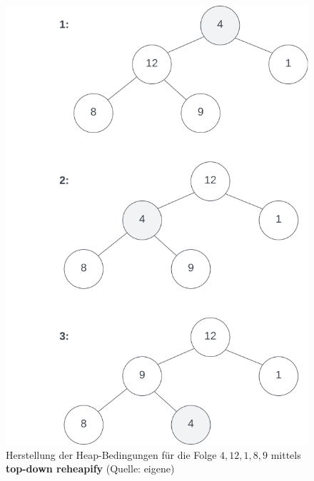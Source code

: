 \begin{figure}
    \begin{center}
        \includegraphics[scale=0.35]{chapters/Datenstrukturen und Algorithmen/img/sink}
        \caption{Herstellung der Heap-Bedingungen für die Folge $4, 12, 1, 8, 9$ mittels \textbf{top-down reheapify} (Quelle: eigene)}
        \label{fig:sink}
    \end{center}
\end{figure}


